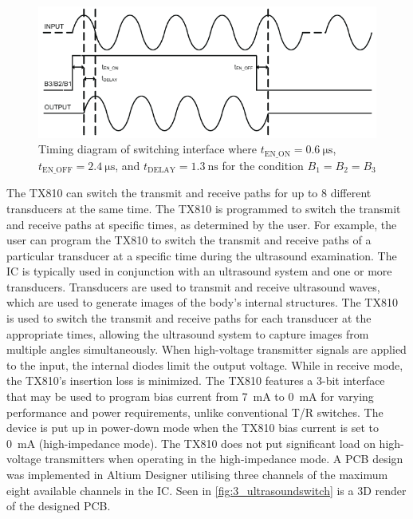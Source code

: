 \begin{figure}[htbp]
	\centering
	\includegraphics[width=.8\textwidth]{Figures/3_tx810_timing.pdf}
	\caption[Timing diagram of switching interface]{Timing diagram of switching interface where $t_{\mathrm{EN\_ON}}=\qty{0.6}{\micro\second}$, $t_{\mathrm{EN\_OFF}}=\qty{2.4}{\micro\second}$, and $t_{\mathrm{DELAY}}=\qty{1.3}{\nano\second}$ for the condition $B_1=B_2=B_3$ \cite{TX810}}
	\label{fig:3_tx810_timing}
\end{figure}
The TX810 can switch the transmit and receive paths for up to 8 different transducers at the same time. The TX810 is programmed to switch the transmit and receive paths at specific times, as determined by the user. For example, the user can program the TX810 to switch the transmit and receive paths of a particular transducer at a specific time during the ultrasound examination. The IC is typically used in conjunction with an ultrasound system and one or more transducers. Transducers are used to transmit and receive ultrasound waves, which are used to generate images of the body's internal structures. The TX810 is used to switch the transmit and receive paths for each transducer at the appropriate times, allowing the ultrasound system to capture images from multiple angles simultaneously. When high-voltage transmitter signals are applied to the input, the internal diodes limit the output voltage. While in receive mode, the TX810's insertion loss is minimized. The TX810 features a 3-bit interface that may be used to program bias current from \qty{7}{\milli\ampere} to \qty{0}{\milli\ampere} for varying performance and power requirements, unlike conventional T/R switches. The device is put up in power-down mode when the TX810 bias current is set to \qty{0}{\milli\ampere} (high-impedance mode). The TX810 does not put significant load on high-voltage transmitters when operating in the high-impedance mode. A PCB design was implemented in Altium Designer \cite{altium} utilising three channels of the maximum eight available channels in the IC. Seen in \cref{fig:3_ultrasoundswitch} is a 3D render of the designed PCB.
